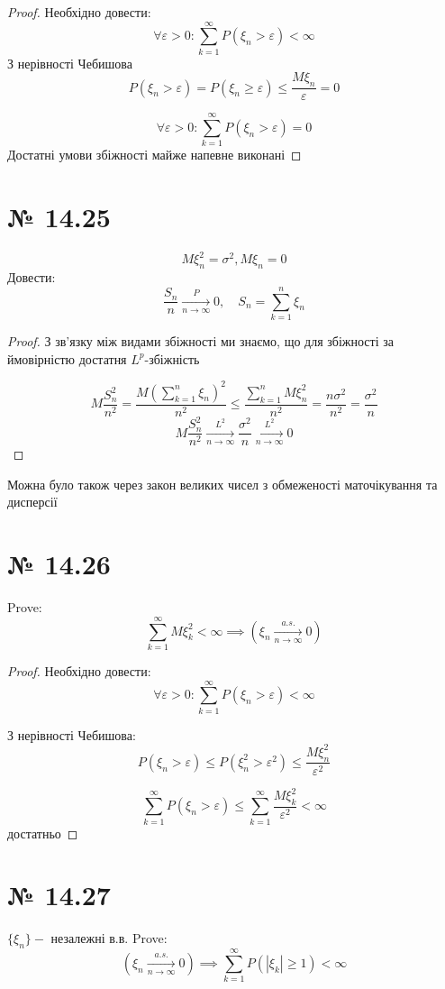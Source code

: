 \documentclass[11pt, a4paper]{article} %
\begin{document}
\begin{proof}
    
    Необхідно довести:
    $$\forall \varepsilon>0: \sum_{k=1}^\infty P(\xi_n>\varepsilon) < \infty$$
    З нерівності Чебишова
    $$P(\xi_n > \varepsilon) = P(\xi_n \ge \varepsilon) \le \frac{M\xi_n}{\varepsilon} = 0$$
    
    $$\forall \varepsilon>0: \sum_{k=1}^\infty P(\xi_n>\varepsilon) = 0$$
    Достатні умови збіжності майже напевне виконані
\end{proof}

\section*{№ 14.25}
$$M\xi^2_n = \sigma^2, M\xi_n = 0$$
Довести:
$$\frac{S_n}{n} \xrightarrow[n\to\infty]{P}0,\quad S_n=\sum_{k=1}^n \xi_n$$

\begin{proof}
    З зв'язку між видами збіжності ми знаємо, що для збіжності за ймовірністю достатня $L^p$-збіжність 

    $$M\frac{S_n^2}{n^2} = \frac{M\left(\sum_{k=1}^n \xi_n\right)^2}{n^2} \le \frac{\sum_{k=1}^n M\xi^2_n}{n^2} = \frac{n\sigma^2}{n^2} = \frac{\sigma^2}{n}$$
    $$M\frac{S_n^2}{n^2} \xrightarrow[n\to\infty]{L^2} \frac{\sigma^2}{n} \xrightarrow[n\to\infty]{L^2} 0$$
\end{proof}
Можна було також через закон великих чисел з обмеженості маточікування та дисперсії

\section*{№ 14.26}
Prove:
$$\sum_{k=1}^\infty M\xi^2_k < \infty \implies \left(\xi_n \xrightarrow[n\to\infty]{a.s.} 0\right)$$

\begin{proof}
    Необхідно довести:
    $$\forall \varepsilon>0: \sum_{k=1}^\infty P(\xi_n>\varepsilon) < \infty$$

    З нерівності Чебишова:
    $$P(\xi_n>\varepsilon) \le P(\xi_n^2>\varepsilon^2) \le \frac{M\xi_n^2}{\varepsilon^2}$$
    
    $$\sum_{k=1}^\infty P(\xi_n>\varepsilon) \le \sum_{k=1}^\infty \frac{M\xi_k^2}{\varepsilon^2} < \infty$$
    достатньо
\end{proof}

\section*{№ 14.27}
$\{\xi_n\} - $ незалежні в.в.
Prove:
$$\left(\xi_n \xrightarrow[n\to\infty]{a.s.} 0 \right) \implies \sum_{k=1}^\infty P(|\xi_k|\ge 1) < \infty$$
\end{document}
